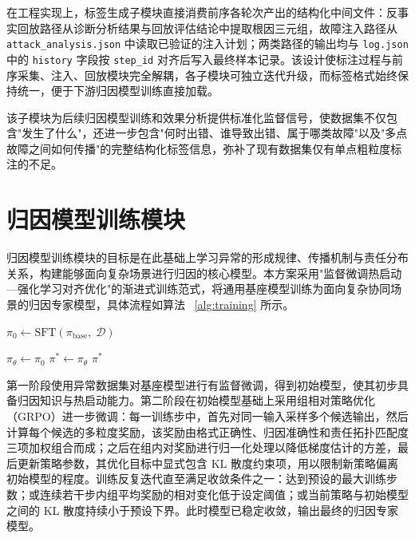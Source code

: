 在工程实现上，标签生成子模块直接消费前序各轮次产出的结构化中间文件：反事实回放路径从诊断分析结果与回放评估结论中提取根因三元组，故障注入路径从 \texttt{attack\_analysis.json} 中读取已验证的注入计划；两类路径的输出均与 \texttt{log.json} 中的 \texttt{history} 字段按 \texttt{step\_id} 对齐后写入最终样本记录。该设计使标注过程与前序采集、注入、回放模块完全解耦，各子模块可独立迭代升级，而标签格式始终保持统一，便于下游归因模型训练直接加载。
 
该子模块为后续归因模型训练和效果分析提供标准化监督信号，使数据集不仅包含"发生了什么"，还进一步包含"何时出错、谁导致出错、属于哪类故障"以及"多点故障之间如何传播"的完整结构化标签信息，弥补了现有数据集仅有单点粗粒度标注的不足。


\section{归因模型训练模块}
 
归因模型训练模块的目标是在此基础上学习异常的形成规律、传播机制与责任分布关系，构建能够面向复杂场景进行归因的核心模型。本方案采用"监督微调热启动—强化学习对齐优化"的渐进式训练范式，将通用基座模型训练为面向复杂协同场景的归因专家模型，具体流程如算法 ~\ref{alg:training} 所示。

\begin{algorithm}[H]
  \caption{归因模型渐进式训练流程}
  \label{alg:training}
 
  $\pi_0 \leftarrow \text{SFT}(\pi_{\text{base}},\; \mathcal{D})$\;
 
  $\pi_\theta \leftarrow \pi_0$\;
  $\pi^* \leftarrow \pi_\theta$\;
  \Return $\pi^*$\;
\end{algorithm}

\vspace{5mm}
第一阶段使用异常数据集对基座模型进行有监督微调，得到初始模型，使其初步具备归因知识与热启动能力。第二阶段在初始模型基础上采用组相对策略优化（GRPO）进一步微调：每一训练步中，首先对同一输入采样多个候选输出，然后计算每个候选的多粒度奖励，该奖励由格式正确性、归因准确性和责任拓扑匹配度三项加权组合而成；之后在组内对奖励进行归一化处理以降低梯度估计的方差，最后更新策略参数，其优化目标中显式包含 KL 散度约束项，用以限制新策略偏离初始模型的程度。训练反复迭代直至满足收敛条件之一：达到预设的最大训练步数；或连续若干步内组平均奖励的相对变化低于设定阈值；或当前策略与初始模型之间的 KL 散度持续小于预设下界。此时模型已稳定收敛，输出最终的归因专家模型。

